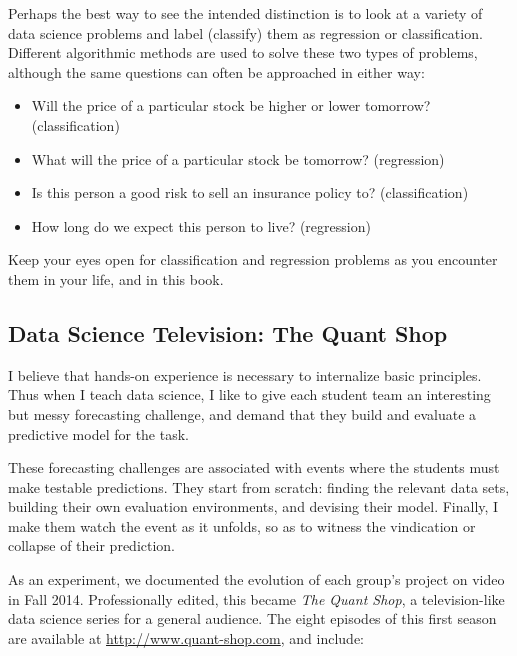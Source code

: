 \documentclass[10pt]{article}
\begin{document}
Perhaps the best way to see the intended distinction is to look at a variety of data science problems and label (classify) them as regression or classification. Different algorithmic methods are used to solve these two types of problems, although the same questions can often be approached in either way:

\begin{itemize}
  \item Will the price of a particular stock be higher or lower tomorrow? (classification)
  \item What will the price of a particular stock be tomorrow? (regression)
  \item Is this person a good risk to sell an insurance policy to? (classification)
  \item How long do we expect this person to live? (regression)
\end{itemize}

Keep your eyes open for classification and regression problems as you encounter them in your life, and in this book.

\subsection{Data Science Television: The Quant Shop}
I believe that hands-on experience is necessary to internalize basic principles. Thus when I teach data science, I like to give each student team an interesting but messy forecasting challenge, and demand that they build and evaluate a predictive model for the task.

These forecasting challenges are associated with events where the students must make testable predictions. They start from scratch: finding the relevant data sets, building their own evaluation environments, and devising their model. Finally, I make them watch the event as it unfolds, so as to witness the vindication or collapse of their prediction.

As an experiment, we documented the evolution of each group's project on video in Fall 2014. Professionally edited, this became \textit{The Quant Shop}, a television-like data science series for a general audience. The eight episodes of this first season are available at \href{http://www.quant-shop.com}{http://www.quant-shop.com}, and include:
\end{document}
